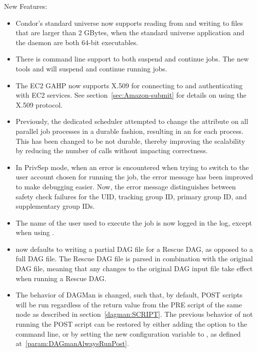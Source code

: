 \noindent New Features:

\begin{itemize}

\item Condor's standard universe now supports reading from and writing to
files that are larger than 2 GBytes,
when the standard universe application and
the  daemon are both 64-bit executables.

\item There is command line support to both suspend and continue jobs. 
The new tools  and  will 
suspend and continue running jobs.

\item The EC2 GAHP now supports X.509 for connecting to and authenticating
with EC2 services.  See section~\ref{sec:Amazon-submit} for details
on using the X.509 protocol.

\item Previously, the dedicated scheduler attempted to change the
 attribute on all parallel job processes in a durable fashion,
resulting in an  for each process.
This has been changed to be not durable, 
thereby improving the scalability by reducing the 
number of  calls without impacting correctness. 

\item In PrivSep mode, when an error is encountered when trying to
switch to the user account chosen for running the job, 
the error message has been improved to make debugging easier.  
Now, the error message distinguishes between safety check failures 
for the UID, tracking group ID, primary group ID, and supplementary group IDs.

\item The name of the user used to execute the job is now logged in
the  log, except when using .

\item {} now defaults to writing a partial DAG file
for a Rescue DAG,
as opposed to a full DAG file.
The Rescue DAG file is parsed in combination with the original DAG file, 
meaning that any
changes to the original DAG input file take effect when running a Rescue DAG.

\item The behavior of DAGMan is changed, such that, by default, 
POST scripts will be run regardless of the return value from 
the PRE script of the same node as described in section~\ref{dagman:SCRIPT}.  
The previous behavior of not running the POST script can be restored by
either adding the  option to the 
command line, 
or by setting the new configuration variable
 to , 
as defined at~\ref{param:DAGmanAlwaysRunPost}.


\end{itemize}
